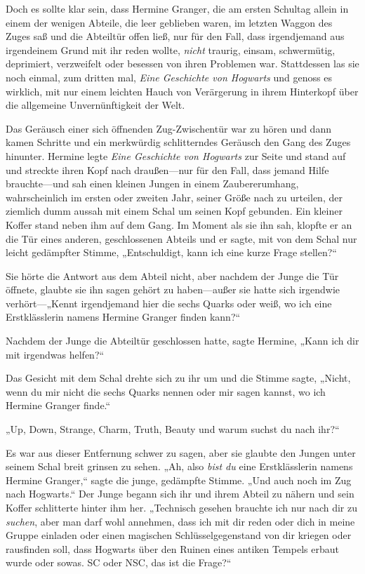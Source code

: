 {Doch es sollte klar sein, dass Hermine Granger, die am ersten Schultag allein in einem der wenigen Abteile, die leer geblieben waren, im letzten Waggon des Zuges saß und die Abteiltür offen ließ, nur für den Fall, dass irgendjemand aus irgendeinem Grund mit ihr reden wollte, \emph{nicht} traurig, einsam, schwermütig, deprimiert, verzweifelt oder besessen von ihren Problemen war. Stattdessen las sie noch einmal, zum dritten mal, \emph{Eine Geschichte von Hogwarts} und genoss es wirklich, mit nur einem leichten Hauch von Verärgerung in ihrem Hinterkopf über die allgemeine Unvernünftigkeit der Welt.

Das Geräusch einer sich öffnenden Zug-Zwischentür war zu hören und dann kamen Schritte und ein merkwürdig schlitterndes Geräusch den Gang des Zuges hinunter. Hermine legte \emph{Eine Geschichte von Hogwarts} zur Seite und stand auf und streckte ihren Kopf nach draußen—nur für den Fall, dass jemand Hilfe brauchte—und sah einen kleinen Jungen in einem Zaubererumhang, wahrscheinlich im ersten oder zweiten Jahr, seiner Größe nach zu urteilen, der ziemlich dumm aussah mit einem Schal um seinen Kopf gebunden. Ein kleiner Koffer stand neben ihm auf dem Gang. Im Moment als sie ihn sah, klopfte er an die Tür eines anderen, geschlossenen Abteils und er sagte, mit von dem Schal nur leicht gedämpfter Stimme, „Entschuldigt, kann ich eine kurze Frage stellen?“

Sie hörte die Antwort aus dem Abteil nicht, aber nachdem der Junge die Tür öffnete, glaubte sie ihn sagen gehört zu haben—außer sie hatte sich irgendwie verhört—„Kennt irgendjemand hier die sechs Quarks oder weiß, wo ich eine Erstklässlerin namens Hermine Granger finden kann?“

Nachdem der Junge die Abteiltür geschlossen hatte, sagte Hermine, „Kann ich dir mit irgendwas helfen?“

Das Gesicht mit dem Schal drehte sich zu ihr um und die Stimme sagte, „Nicht, wenn du mir nicht die sechs Quarks nennen oder mir sagen kannst, wo ich Hermine Granger finde.“

„Up, Down, Strange, Charm, Truth, Beauty und warum suchst du nach ihr?“

Es war aus dieser Entfernung schwer zu sagen, aber sie glaubte den Jungen unter seinem Schal breit grinsen zu sehen. „Ah, also \emph{bist du} eine Erstklässlerin namens Hermine Granger,“ sagte die junge, gedämpfte Stimme. „Und auch noch im Zug nach Hogwarts.“ Der Junge begann sich ihr und ihrem Abteil zu nähern und sein Koffer schlitterte hinter ihm her. „Technisch gesehen brauchte ich nur nach dir zu \emph{suchen}, aber man darf wohl annehmen, dass ich mit dir reden oder dich in meine Gruppe einladen oder einen magischen Schlüsselgegenstand von dir kriegen oder rausfinden soll, dass Hogwarts über den Ruinen eines antiken Tempels erbaut wurde oder sowas. SC oder NSC, das ist die Frage?“

}
